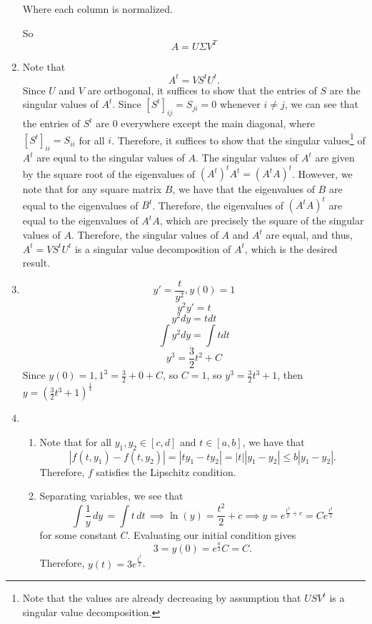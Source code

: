 \documentclass[12pt]{article}
\begin{document}
\begin{enumerate}[leftmargin=0em]
Where each column is normalized.

So
\[
A = U \Sigma V^T
\]

    \item
    Note that
    \[A^{t} = VS^{t}U^{t}.\]
    Since $U$ and $V$ are orthogonal, it suffices to show that the entries of $S$ are the singular values of $A^{t}$. Since ${[S^{t}]}_{ij} = S_{ji} = 0$ whenever $i\neq j$, we can see that the entries of $S^{t}$ are $0$ everywhere except the main diagonal, where ${[S^{t}]}_{ii} = S_{ii}$ for all $i$. Therefore, 
    it suffices to show that the singular values\footnote{Note that the values are already decreasing by assumption that $USV^{t}$ is a singular value decomposition.} of $A^{t}$ are equal to the singular values of $A$. The singular values of $A^{t}$ are given by the square root of the eigenvalues of ${(A^{t})}^{t}A^{t} = {(A^{t}A)}^{t}$. However, we note that for any square matrix $B$, we have that the eigenvalues of $B$ are equal to the eigenvalues of $B^{t}$. Therefore, the eigenvalues of ${(A^{t}A)}^{t}$ are equal to the eigenvalues of
    $A^{t}A$, which are precisely the square of the singular values of $A$. Therefore, the singular values of $A$ and $A^{t}$ are equal, and thus, $A^{t} = VS^{t}U^{t}$ is a singular value decomposition of $A^{t}$, which is the desired result.

    \item 
    \[y' = \frac{t}{y^2}, y(0) = 1\]
    \[y^2y' = t\]
    \[y^2dy = tdt\]
    \[\int y^2dy = \int tdt\]
    \[y^3 = \frac{3}{2}t^2 + C\]
    Since $y(0) = 1, 1^3 = \frac{3}{2} + 0 + C$, so $C = 1$, so $y^3 = \frac{3}{2}t^3+1$, then $y = (\frac{3}{2}t^{3}+1)^{\frac{1}{3}}$

    \item
    \begin{enumerate}[leftmargin=!]
        \item 
        Note that for all $y_1,y_2\in [c,d]$ and $t\in [a,b]$, we have that
        \[|f(t,y_1)-f(t,y_2)| = |ty_{1}-ty_{2}| = |t||y_{1}-y_{2}|\leq b|y_{1}-y_{2}|.\]
        Therefore, $f$ satisfies the Lipschitz condition.

        \item
        Separating variables, we see that
        \[\int\frac{1}{y}\, dy\, = \int t\, dt\, \implies \ln(y) = \frac{t^2}{2}+c \implies y = e^{\frac{t^2}{2}+c} = Ce^{\frac{t^2}{2}}\]
        for some constant $C$. Evaluating our initial condition gives
        \[3=y(0) = e^{\frac{0}{2}}C=C.\]
        Therefore, $y(t) = 3e^{\frac{t^2}{2}}$.


\end{enumerate}
\end{enumerate}
\end{document}
